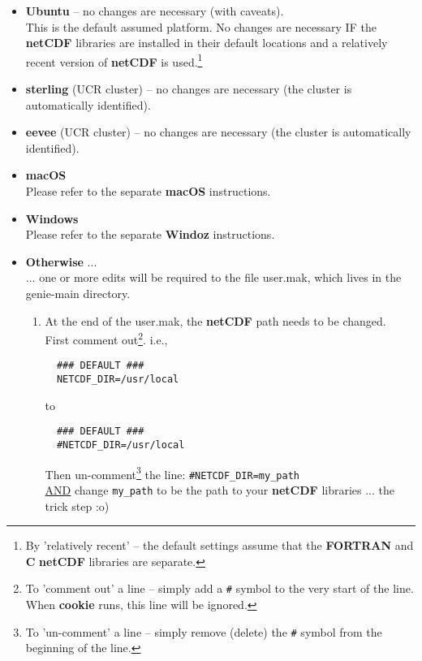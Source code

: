 \begin{itemize}

\vspace{1mm}
\item \textbf{Ubuntu} -- no changes are necessary (with caveats).
\\ This is the default assumed platform. No changes are necessary IF the \textbf{netCDF} libraries are installed in their default locations and a relatively recent version of \textbf{netCDF} is used.\footnote{By 'relatively recent' -- the default settings assume that the \textbf{FORTRAN} and \textbf{C} \textbf{netCDF} libraries are separate.}

\vspace{1mm}
\item \textbf{sterling} (UCR cluster) -- no changes are necessary (the cluster is automatically identified).

\vspace{1mm}
\item \textbf{eevee} (UCR cluster) -- no changes are necessary (the cluster is automatically identified).

\vspace{1mm}
\item \textbf{macOS}
\\ Please refer to the separate \textbf{macOS} instructions.

\vspace{1mm}
\item \textbf{Windows} 
\\ Please refer to the separate \textbf{Windoz} instructions.

\vspace{1mm} 
\item \textbf{Otherwise} ...
\\... one or more edits will be required to the file \textsf{\footnotesize user.mak}, which lives in the \textsf{\footnotesize genie-main} directory.

\begin{enumerate}[noitemsep]
\vspace{2mm}
\item At the end of the \textsf{\footnotesize user.mak}, the \textbf{netCDF} path needs to be changed.
\vspace{1mm}  
\\First comment out\footnote{To 'comment out' a line -- simply add a \texttt{\#} symbol to the very start of the line. When \textbf{cookie} runs, this line will be ignored.}. i.e.,
\small\begin{verbatim}
  ### DEFAULT ###
  NETCDF_DIR=/usr/local
\end{verbatim}\normalsize
to
\small\begin{verbatim}
  ### DEFAULT ###
  #NETCDF_DIR=/usr/local
\end{verbatim}\normalsize
Then un-comment\footnote{To 'un-comment' a line -- simply remove (delete) the \texttt{\#} symbol from the beginning of the line.} the line: \texttt{\#NETCDF\_DIR=my\_path}
\\\uline{AND} change \texttt{my\_path} to be the path to your \textbf{netCDF} libraries ... the trick step :o)


\end{enumerate}
\end{itemize}
